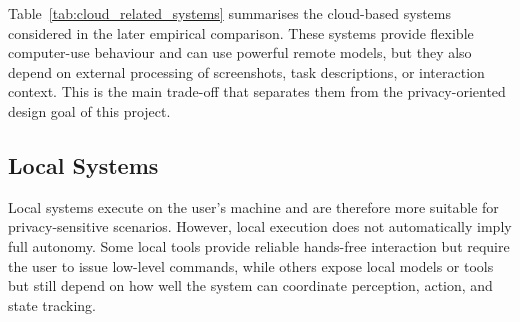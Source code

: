 Table~\ref{tab:cloud_related_systems} summarises the cloud-based systems considered in the later empirical comparison. These systems provide flexible computer-use behaviour and can use powerful remote models, but they also depend on external processing of screenshots, task descriptions, or interaction context. This is the main trade-off that separates them from the privacy-oriented design goal of this project.

\begin{table}[H]
\centering
{\small
\renewcommand{\arraystretch}{1.15}
}
\caption{Positioning of cloud-based desktop automation systems.}
\label{tab:cloud_related_systems}
\end{table}

\subsection{Local Systems}

Local systems execute on the user's machine and are therefore more suitable for privacy-sensitive scenarios. However, local execution does not automatically imply full autonomy. Some local tools provide reliable hands-free interaction but require the user to issue low-level commands, while others expose local models or tools but still depend on how well the system can coordinate perception, action, and state tracking.

